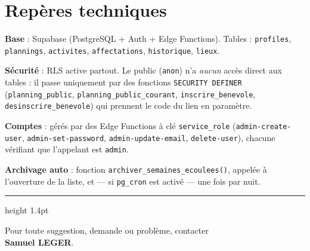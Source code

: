 \documentclass[11pt,a4paper]{article}
\begin{document}
\section{Repères techniques}
\begin{technicalbox}
\textbf{Base} : Supabase (PostgreSQL + Auth + Edge Functions).
Tables : \texttt{profiles}, \texttt{plannings}, \texttt{activites}, \texttt{affectations},
\texttt{historique}, \texttt{lieux}.

\vspace{4pt}
\textbf{Sécurité} : RLS active partout. Le public (\texttt{anon}) n'a \emph{aucun} accès direct
aux tables : il passe uniquement par des fonctions \texttt{SECURITY DEFINER}
(\texttt{planning\_public}, \texttt{planning\_public\_courant}, \texttt{inscrire\_benevole},
\texttt{desinscrire\_benevole}) qui prennent le code du lien en paramètre.

\vspace{4pt}
\textbf{Comptes} : gérés par des Edge Functions à clé \texttt{service\_role}
(\texttt{admin-create-user}, \texttt{admin-set-password}, \texttt{admin-update-email},
\texttt{delete-user}), chacune vérifiant que l'appelant est \texttt{admin}.

\vspace{4pt}
\textbf{Archivage auto} : fonction \texttt{archiver\_semaines\_ecoulees()}, appelée à
l'ouverture de la liste, et — si \texttt{pg\_cron} est activé — une fois par nuit.
\end{technicalbox}

\vspace{18pt}
{\color{border}\hrule height 1.4pt}
\vspace{10pt}
\noindent\small Pour toute suggestion, demande ou problème, contacter\\
{\sffamily{}\selectfont\bfseries Samuel LEGER}.
\end{document}

